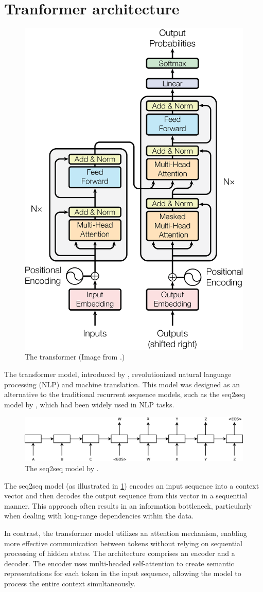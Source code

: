 
\section{Tranformer architecture}
\begin{figure}[H]
    \centering
    \includegraphics[width=0.4\linewidth]{figures/transformer.png}
    \caption{The transformer (Image from \cite{transformer2017}.)}
\end{figure}
The transformer model, introduced by \cite{transformer2017}, revolutionized natural language processing (NLP) and machine translation. This model was designed as an alternative to the traditional recurrent sequence models, such as the seq2seq model by \cite{seq2seq}, which had been widely used in NLP tasks.
\begin{figure}[H]
    \centering
    \includegraphics[width=0.8\linewidth]{figures/seq2seq.eps}
    \caption{The seq2seq model by \cite{seq2seq}.}
    \label{fig:seq2seq}
\end{figure}
The seq2seq model (as illustrated in \cref{fig:seq2seq}) encodes an input sequence into a context vector and then decodes the output sequence from this vector in a sequential manner. This approach often results in an information bottleneck, particularly when dealing with long-range dependencies within the data.

In contrast, the transformer model utilizes an attention mechanism, enabling more effective communication between tokens without relying on sequential processing of hidden states. The architecture comprises an encoder and a decoder. The encoder uses multi-headed self-attention to create semantic representations for each token in the input sequence, allowing the model to process the entire context simultaneously.

